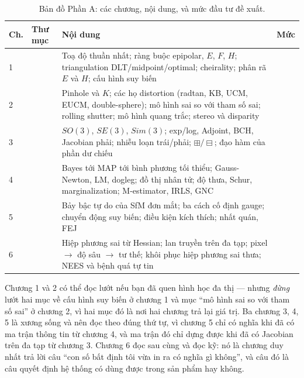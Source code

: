 \documentclass[../vslam.tex]{subfiles}
\begin{document}
\begin{table}[H]\centering\small
\caption{Bản đồ Phần A: các chương, nội dung, và mức đầu tư đề xuất.}
\begin{tabularx}{\linewidth}{@{}L{0.8cm}L{3.5cm}YL{1.6cm}@{}}
\toprule
\textbf{Ch.} & \textbf{Thư mục} & \textbf{Nội dung} & \textbf{Mức}\\
 &  & Toạ độ thuần nhất; ràng buộc epipolar, \(E\), \(F\), \(H\); triangulation DLT/midpoint/optimal; cheirality; phân rã \(E\) và \(H\); cấu hình suy biến & \\
2 &  & Pinhole và \(K\); các họ distortion (radtan, KB, UCM, EUCM, double-sphere); mô hình sai so với tham số sai; rolling shutter; mô hình quang trắc; stereo và disparity & \\
3 &  & \(SO(3)\), \(SE(3)\), \(Sim(3)\); exp/log, Adjoint, BCH, Jacobian phải; nhiễu loạn trái/phải; \(\boxplus/\boxminus\); đạo hàm của phần dư chiếu & \\
4 &  & Bayes tới MAP tới bình phương tối thiểu; Gauss-Newton, LM, dogleg; đồ thị nhân tử; độ thưa, Schur, marginalization; M-estimator, IRLS, GNC & \\
5 &  & Bảy bậc tự do của SfM đơn mắt; ba cách cố định gauge; chuyển động suy biến; điều kiện kích thích; nhất quán, FEJ & \\
6 &  & Hiệp phương sai từ Hessian; lan truyền trên đa tạp; pixel \(\rightarrow\) độ sâu \(\rightarrow\) tư thế; khôi phục hiệp phương sai thưa; NEES và bệnh quá tự tin & \\
\bottomrule
\end{tabularx}
\end{table}

\noindent Chương 1 và 2 có thể đọc lướt nếu bạn đã quen hình học đa thị --- nhưng \emph{đừng} lướt hai mục về cấu hình suy biến ở chương 1 và mục ``mô hình sai so với tham số sai'' ở chương 2, vì hai mục đó là nơi hai chương trả lại giá trị. Ba chương 3, 4, 5 là xương sống và nên đọc theo đúng thứ tự, vì chương 5 chỉ có nghĩa khi đã có ma trận thông tin từ chương 4, và ma trận đó chỉ dựng được khi đã có Jacobian trên đa tạp từ chương 3. Chương 6 đọc sau cùng và đọc kỹ: nó là chương duy nhất trả lời câu ``con số bất định tôi vừa in ra có nghĩa gì không'', và câu đó là câu quyết định hệ thống có dùng được trong sản phẩm hay không.
\end{document}

